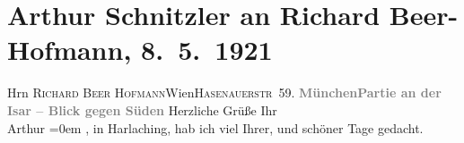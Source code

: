 

         
         \renewcommand{\erwaehntePersonen}{Personen: Richard Beer-Hofmann}
         \renewcommand{\erwaehnteOrte}{Orte: Harlaching, Hasenauerstraße, Isar, München, Wien}
         \renewcommand{\erwaehnteWerke}{}
               \section[Arthur Schnitzler an Richard Beer-Hofmann, 8. 5. 1921]{ Arthur Schnitzler an Richard Beer-Hofmann, 8. 5. 1921}\nopagebreak{}\rehead{ }\begin{ledgroupsized}[t]{13cm}\normalsize\beginnumbering \toendnotes[C]{\smallbreak\pagebreak[2]} 
\toendnotes[C]{\smallbreak}\pstart{}{\pb}Hrn \textsc{Richard Beer Hofmann}\pend{}\pstart{}Wien\pend{}\pstart{}\textsc{Hasenauerstr 59}.\pend{}{\bigskip}\pstart
           \noindent{}\centering{}{\pb}\textcolor{gray}{\textbf{\textbf{München}\hspace*{1.5em}Partie an der Isar – Blick gegen Süden}}\pend
           \pstart
           {\pb}Herzliche Grüße\pend
           \pstart
           Ihr{\\[\baselineskip]}\spacefill\mbox{Arthur}\pend
           \leftskip=0em{}\pstart
           \raggedleft{}\label{T_L02366-1v}\label{T_L02366-1h}\pend
           \pstart
           \label{KLL02366_Beer-Hofmann-1v}\label{KLL02366_Beer-Hofmann-1h}, in Harlaching, hab ich viel Ihrer,
                  und schöner Tage gedacht.\pend
           
         
         \endnumbering{}\end{ledgroupsized}  \newcommand{\dateiname}{L02366}\newcommand{\titel}{Arthur Schnitzler an Richard Beer-Hofmann, 8. 5. 1921}\newcommand{\editorInnen}{Martin Anton Müller und Gerd-Hermann Susen}
      
